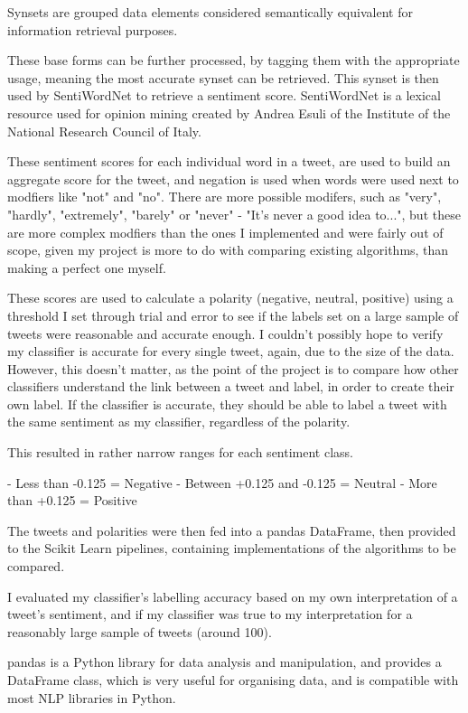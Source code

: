 \documentclass{article}
\begin{document}
Synsets are grouped data elements considered semantically equivalent for information retrieval purposes\autocite[14]{sr}.

These base forms can be further processed, by tagging them with the appropriate usage, meaning the most accurate synset can be retrieved.
This synset is then used by SentiWordNet to retrieve a sentiment score.
SentiWordNet is a lexical resource used for opinion mining created by Andrea Esuli of the Institute of the National Research Council of Italy\autocite[14]{esuli}.

These sentiment scores for each individual word in a tweet, are used to build an aggregate score for the tweet, and negation is used when words were used next to modfiers like "not" and "no".
There are more possible modifers, such as "very", "hardly", "extremely", "barely" or "never" - "It's never a good idea to...", but these are more complex modfiers than the ones I implemented and were fairly out of scope, given my project is more to do with comparing existing algorithms, than making a perfect one myself.

These scores are used to calculate a polarity (negative, neutral, positive) using a threshold I set through trial and error to see if the labels set on a large sample of tweets were reasonable and accurate enough.
I couldn't possibly hope to verify my classifier is accurate for every single tweet, again, due to the size of the data.
However, this doesn't matter, as the point of the project is to compare how other classifiers understand the link between a tweet and label, in order to create their own label.
If the classifier is accurate, they should be able to label a tweet with the same sentiment as my classifier, regardless of the polarity.

This resulted in rather narrow ranges for each sentiment class.

- Less than -0.125 = Negative
- Between +0.125 and -0.125 = Neutral
- More than +0.125 = Positive

The tweets and polarities were then fed into a pandas DataFrame, then provided to the Scikit Learn pipelines, containing implementations of the algorithms to be compared.

I evaluated my classifier's labelling accuracy based on my own interpretation of a tweet's sentiment, and if my classifier was true to my interpretation for a reasonably large sample of tweets (around 100).

pandas is a Python library for data analysis and manipulation, and provides a DataFrame class, which is very useful for organising data, and is compatible with most NLP libraries in Python.
\end{document}
